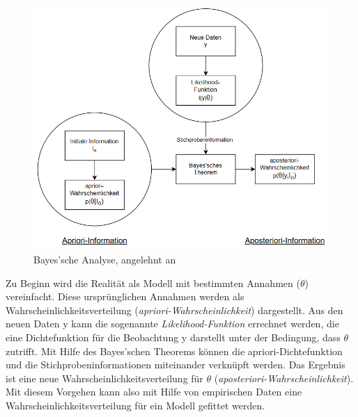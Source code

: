 \begin{figure}[H]
	\centering
	\includegraphics[scale = 0.8]{Bilder/bayesianInterence.png}
	\caption{Bayes'sche Analyse, angelehnt an \cite{nenning_bayessche_1980}}
	\label{fig:bayesianInference}
\end{figure}

Zu Beginn wird die Realität als Modell mit bestimmten Annahmen ($\theta$) vereinfacht.
Diese ursprünglichen Annahmen werden als Wahrscheinlichkeitsverteilung (\emph{apriori-Wahr\-schein\-lich\-keit}) dargestellt. 
Aus den neuen Daten y kann die sogenannte
\emph{Likelihood-Funktion} errechnet werden, die eine Dichtefunktion für die Beobachtung y darstellt unter der Bedingung, dass $\theta$ zutrifft.
Mit Hilfe des Bayes'schen Theorems können die apriori-Dichtefunktion und die Stichprobeninformationen miteinander verknüpft werden.
Das Ergebnis ist eine neue Wahrscheinlichkeitsverteilung für $\theta$ (\emph{aposteriori-Wahrscheinlichkeit}). \cite{nenning_bayessche_1980}
Mit diesem Vorgehen kann also mit Hilfe von empirischen Daten eine Wahrscheinlichkeitsverteilung für ein Modell gefittet werden.

